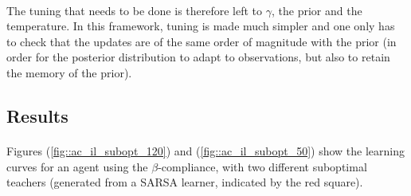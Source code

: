 \documentclass[a4paper]{report}
\begin{document}
{{{{			\paragraph{} The tuning that needs to be done is therefore left to $\gamma$, the prior and the temperature. In this framework, tuning is made much simpler and one only has to check that the updates are of the same order of magnitude with the prior (in order for the posterior distribution to adapt to observations, but also to retain the memory of the prior). 
			}
			\subsection{Results}
			{
				\paragraph{} Figures (\ref{fig::ac_il_subopt_120}) and (\ref{fig::ac_il_subopt_50}) show the learning curves for an agent using the $\beta$-compliance, with two different suboptimal teachers (generated from a SARSA learner, indicated by the red square). 
				
}}}}
\end{document}
